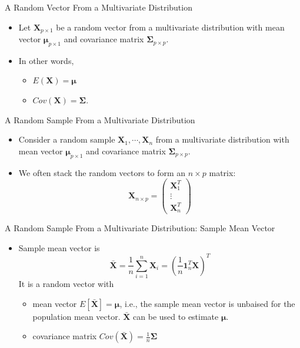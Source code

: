 \documentclass[
  ignorenonframetext,
]{beamer}
\providecommand{\tightlist}{%
  \setlength{\itemsep}{0pt}\setlength{\parskip}{0pt}}
\begin{document}
\begin{frame}{A Random Vector From a Multivariate Distribution}
\protect\hypertarget{a-random-vector-from-a-multivariate-distribution}{}
\begin{itemize}
\tightlist
\item
  Let \(\mathbf X_{p\times 1}\) be a random vector from a multivariate
  distribution with mean vector \(\boldsymbol \mu_{p\times 1}\) and
  covariance matrix \(\boldsymbol \Sigma_{p\times p}\).
\item
  In other words,

  \begin{itemize}
  \tightlist
  \item
    \(E(\mathbf X)=\boldsymbol \mu\)
  \item
    \(Cov(\mathbf X)=\boldsymbol \Sigma\).
  \end{itemize}
\end{itemize}
\end{frame}

\begin{frame}{A Random Sample From a Multivariate Distribution}
\protect\hypertarget{a-random-sample-from-a-multivariate-distribution}{}
\begin{itemize}
\tightlist
\item
  Consider a random sample \(\mathbf X_1, \cdots, \mathbf X_n\) from a
  multivariate distribution with mean vector
  \(\boldsymbol \mu_{p\times 1}\) and covariance matrix
  \(\boldsymbol \Sigma_{p\times p}\).
\item
  We often stack the random vectors to form an \(n\times p\) matrix:
  \[\mathbf X_{n\times p}=\begin{pmatrix}\mathbf X_1^T \\ \vdots \\ \mathbf X_n^T\end{pmatrix}\]
\end{itemize}
\end{frame}

\begin{frame}{A Random Sample From a Multivariate Distribution: Sample
Mean Vector}
\protect\hypertarget{a-random-sample-from-a-multivariate-distribution-sample-mean-vector}{}
\begin{itemize}
\tightlist
\item
  Sample mean vector is
  \[\bar{\mathbf X}=\frac{1}{n}\sum_{i=1}^n \mathbf X_i=(\frac{1}{n}\mathbf 1_n^T \mathbf X)^T\]
  It is a random vector with

  \begin{itemize}
  \tightlist
  \item
    mean vector \(E[\bar{\mathbf X}]=\boldsymbol \mu\), i.e., the sample
    mean vector is unbaised for the population mean vector.
    \(\bar{\mathbf X}\) can be used to estimate \(\boldsymbol \mu\).
  \item
    covariance matrix
    \(Cov(\bar{\mathbf X}) = \frac{1}{n} \boldsymbol \Sigma\)
  \end{itemize}
\end{itemize}
\end{frame}
\end{document}
